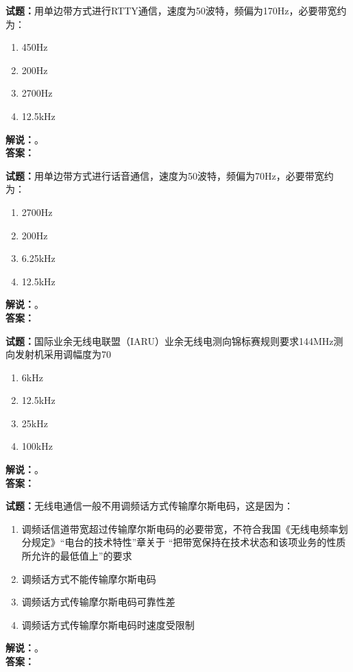 \documentclass{ctexbook}
\begin{document}
\bigskip




\noindent\textbf{试题：}用单边带方式进行RTTY通信，速度为50波特，频偏为170Hz，必要带宽约为：
\begin{enumerate}[leftmargin=3em]
\item 450Hz 
\item 200Hz
\item 2700Hz
\item 12.5\unit{\kHz}
\end{enumerate}
\noindent\textbf{解说：}\textbf{}。\\\noindent\textbf{答案：}

\bigskip




\noindent\textbf{试题：}用单边带方式进行话音通信，速度为50波特，频偏为70Hz，必要带宽约为：
\begin{enumerate}[leftmargin=3em]
\item 2700Hz
\item 200Hz
\item 6.25\unit{\kHz}
\item 12.5\unit{\kHz}
\end{enumerate}
\noindent\textbf{解说：}\textbf{}。\\\noindent\textbf{答案：}

\bigskip




\noindent\textbf{试题：}国际业余无线电联盟（IARU）业余无线电测向锦标赛规则要求144\unit{\MHz}测向发射机采用调幅度为70%
\begin{enumerate}[leftmargin=3em]
\item 6\unit{\kHz}
\item 12.5\unit{\kHz}
\item 25\unit{\kHz}
\item 100\unit{\kHz}
\end{enumerate}
\noindent\textbf{解说：}\textbf{}。\\\noindent\textbf{答案：}

\bigskip




\noindent\textbf{试题：}无线电通信一般不用调频话方式传输摩尔斯电码，这是因为：
\begin{enumerate}[leftmargin=3em]
\item 调频话信道带宽超过传输摩尔斯电码的必要带宽，不符合我国《无线电频率划分规定》“电台的技术特性”章关于 “把带宽保持在技术状态和该项业务的性质所允许的最低值上”的要求
\item 调频话方式不能传输摩尔斯电码
\item 调频话方式传输摩尔斯电码可靠性差
\item 调频话方式传输摩尔斯电码时速度受限制
\end{enumerate}
\noindent\textbf{解说：}\textbf{}。\\\noindent\textbf{答案：}
\end{document}
